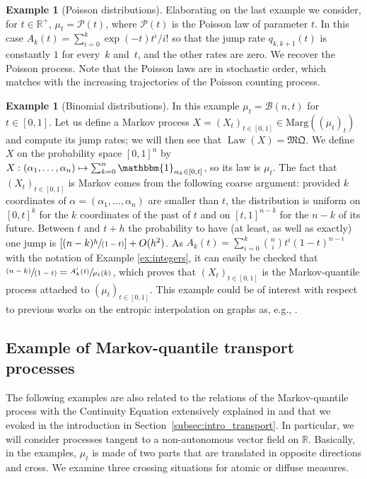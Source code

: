 \documentclass[JEP,XML,SOM,Unicode,NoEqCountersInSection,NoFloatCountersInSection,published]{cedram}
\newcommand\mto{\mathchoice{\longmapsto}{\mapsto}{\mapsto}{\mapsto}}
\newcommand{\spfrac}[2]{\sfrac{#1}{(#2)}}
\theoremstyle{plain}
\theoremstyle{definition}
\newtheorem{ex}[them]{Example}
\newcommand{\mq}{\mathfrak{MQ}}
\newcommand{\one}{\mathbbm{1}}
\newcommand{\ma}{\mathrm{Marg}}
\newcommand{\R}{\mathbb{R}}
\newcommand{\law}{\operatorname{Law}}
\begin{document}
\begin{ex}[Poisson distributions]\label{ex:Poisson}
Elaborating on the last example we consider, for $t\in \R^+$, $\mu_t=\mathcal{P}(t)$, where $\mathcal{P}(t)$ is the Poisson law of parameter $t$. In this case $A_k(t)=\sum_{i=0}^k\exp(-t)t^i/i!$ so that the jump rate $q_{k,k+1}(t)$ is constantly $1$ for every~$k$ and~$t$, and the other rates are zero. We recover the Poisson process. Note that the Poisson laws are in stochastic order, which matches with the increasing trajectories of the Poisson counting process.
\end{ex}

\begin{ex}[Binomial distributions]\label{ex:Binomial}
In this example $\mu_t=\mathcal{B}(n,t)$ for $t\in [0,1]$. Let us define a Markov process $X=(X_t)_{t\in[0,1]}\in\ma((\mu_t)_t)$ and compute its jump rates; we will then see that $\law(X)=\mq$. We define $X$ on the probability space $[0,1]^n$ by $X:(\alpha_1,\ldots,\alpha_n)\mto\sum_{k=0}^n \one_{\alpha_k\in[0,t]}$, so its law is $\mu_t$. The fact that $(X_t)_{t\in[0,1]}$ is Markov comes from the following coarse argument: provided $k$ coordinates of $\alpha=(\alpha_1,\ldots,\alpha_n)$ are smaller than $t$, the distribution is uniform on $[0,t]^k$ for the $k$ coordinates of the past of $t$ and on $[t,1]^{n-k}$ for the $n-k$ of its future. Between $t$ and $t+h$ the probability to have (at least, as well as exactly) one jump is $[(n-k)\spfrac{h}{1-t}]+O(h^2)$. As $A_k(t)=\sum_{i=0}^k \binom{n}{i} t^i(1-t)^{n-i}$ with the notation of Exam\-ple \ref{ex:integers}, it can easily be checked that $\spfrac{(n-k)}{1-t}=\sfrac{A'_k(t)}{\mu_t(k)}$, which proves that $(X_t)_{t\in[0,1]}$ is the Markov-quantile process attached to $(\mu_t)_{t\in[0,1]}$. This example could be of interest with respect to previous works on the entropic interpolation on graphs as, e.g., \cite{Hil_ejp,Leo16}.
\end{ex}

\subsection{Example of Markov-quantile transport processes}\label{ss:ex_CE}

The following examples are also related to the relations of the Markov-quantile process with the Continuity Equation extensively explained in \cite{BouJui2} and that we evoked in the introduction in Section~\ref{subsec:intro_transport}. In particular, we will consider processes tangent to a non-autonomous vector field on $\R$. Basically, in the examples, $\mu_t$ is made of two parts that are translated in opposite directions and cross. We examine three crossing situations for atomic or diffuse measures.
\end{document}
